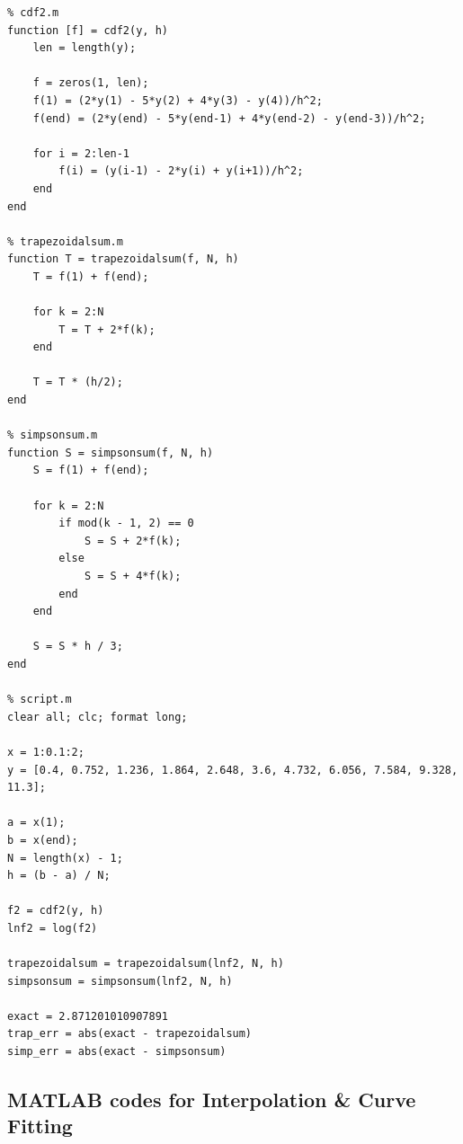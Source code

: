 \documentclass{article}
\begin{document}
\begin{lstlisting}
% cdf2.m
function [f] = cdf2(y, h)
    len = length(y);

    f = zeros(1, len);
    f(1) = (2*y(1) - 5*y(2) + 4*y(3) - y(4))/h^2;
    f(end) = (2*y(end) - 5*y(end-1) + 4*y(end-2) - y(end-3))/h^2;
    
    for i = 2:len-1
        f(i) = (y(i-1) - 2*y(i) + y(i+1))/h^2;
    end
end

% trapezoidalsum.m
function T = trapezoidalsum(f, N, h)
    T = f(1) + f(end);
    
    for k = 2:N
        T = T + 2*f(k);
    end

    T = T * (h/2);
end

% simpsonsum.m
function S = simpsonsum(f, N, h)
    S = f(1) + f(end);

    for k = 2:N
        if mod(k - 1, 2) == 0
            S = S + 2*f(k);
        else
            S = S + 4*f(k);
        end
    end

    S = S * h / 3;
end

% script.m
clear all; clc; format long;

x = 1:0.1:2;
y = [0.4, 0.752, 1.236, 1.864, 2.648, 3.6, 4.732, 6.056, 7.584, 9.328, 11.3];

a = x(1); 
b = x(end); 
N = length(x) - 1;
h = (b - a) / N;

f2 = cdf2(y, h)
lnf2 = log(f2)

trapezoidalsum = trapezoidalsum(lnf2, N, h)
simpsonsum = simpsonsum(lnf2, N, h)

exact = 2.871201010907891
trap_err = abs(exact - trapezoidalsum)
simp_err = abs(exact - simpsonsum)
\end{lstlisting}

\bigskip

\subsection*{MATLAB codes for Interpolation \& Curve Fitting}
\end{document}
